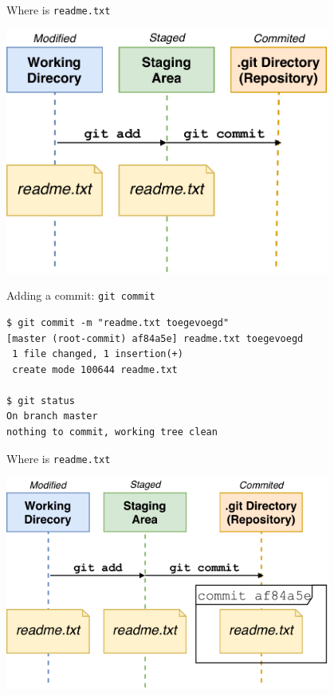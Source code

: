 \documentclass[
  11pt,
  american,
  ignorenonframetext,
  aspectratio=43,
  compress,
  xcolor=dvipsnames]{beamer}
\begin{document}
\begin{frame}{Where is \texttt{readme.txt}}
\protect\hypertarget{where-is-readme.txt-1}{}
\begin{center}
\includegraphics[width=0.8\textwidth]{./images/git_workflow_sa.pdf}
\end{center}
\end{frame}

\begin{frame}[fragile]{Adding a commit: \texttt{git\ commit}}
\protect\hypertarget{adding-a-commit-git-commit}{}
\begin{verbatim}
$ git commit -m "readme.txt toegevoegd"
[master (root-commit) af84a5e] readme.txt toegevoegd
 1 file changed, 1 insertion(+)
 create mode 100644 readme.txt

$ git status
On branch master
nothing to commit, working tree clean
\end{verbatim}
\end{frame}

\begin{frame}{Where is \texttt{readme.txt}}
\protect\hypertarget{where-is-readme.txt-2}{}
\begin{center}
\includegraphics[width=0.8\textwidth]{./images/git_workflow_in_repo.pdf}
\end{center}
\end{frame}
\end{document}
